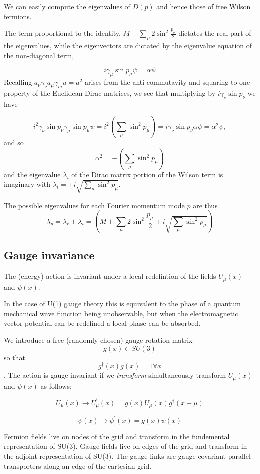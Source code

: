 \documentclass[letter,10pt]{report}
\begin{document}
We can easily compute the eigenvalues of $D(p)$ and hence those of free Wilson fermions.

The term proportional to the identity, $ M + \sum_\mu 2 \sin^2 \frac{p_\mu}{2}$ dictates the real part of the
eigenvalues, while the eigenvectors are dictated by the eigenvalue equation of the non-diagonal term,

$$
i \gamma_\mu \sin p_\mu \psi = \alpha \psi
$$
Recalling $ a_\nu \gamma_\nu a_\mu \gamma_mu = a^2$ arises from the anti-commutavity and squaring to one property
of the Euclidean Dirac matrices, we see that multiplying by $i \gamma_\nu \sin p_\nu $ we have

$$
i^2 \gamma_\nu \sin p_\nu \gamma_\mu \sin p_\mu \psi = i^2 \left(\sum_\mu \sin^2 p_\mu\right) =   i \gamma_\nu \sin p_\nu \alpha \psi = \alpha^2 \psi,
$$
and so
$$
\alpha^2 = - \left(\sum_\mu \sin^2 p_\mu\right)
$$
and the eigenvalue $\lambda_i$ of the Dirac matrix portion of the Wilson term is imaginary with $\lambda_i = \pm i \sqrt{\sum_\mu \sin^2 p_\mu }$.

The possible eigenvalues for each Fourier momentum mode $p$ are thus
$$
\lambda_p = \lambda_r + \lambda_i = \left( M + \sum_\mu 2 \sin^2 \frac{p_\mu}{2} \pm  i \sqrt{\sum_\mu \sin^2 p_\mu } \right)
$$


\subsection{Gauge invariance}

The (energy) action is invariant under a local redefintion of the fields $U_\mu(x)$ and $\psi(x)$.

In the case of U(1) gauge theory this is equivalent to the phase of a quantum mechanical wave function being unobservable,
but when the electromagnetic vector potential can be redefined a local phase can be absorbed.

We introduce a free (randomly chosen) gauge rotation matrix $$g(x) \in SU(3)$$ so that $$ g^\dagger(x) g(x) = 1 \forall x$$.
The action is gauge invariant if we \emph{transform} simultaneously transform $U_\mu(x)$ and $\psi(x)$ as follows:

$$U_\mu(x) \to U_\mu^\prime(x) = g(x) U_\mu(x) g^\dagger(x+\mu)$$

$$\psi(x) \to \psi^\prime(x) = g(x) \psi(x)$$

Fermion fields live on nodes of the grid and transform in the fundemental representation of SU(3).
Gauge fields live on edges of the grid and transform in the adjoint representation of SU(3).
The gauge links are gauge covariant parallel transporters along an edge of the cartesian grid.
\end{document}
